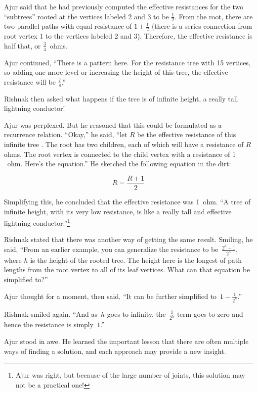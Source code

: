 Ajur said that he had previously computed the effective resistances for the two ``subtrees'' rooted at the vertices labeled 2 and 3 to be $\frac{1}{2}$. From the root, there are two parallel paths with equal resistance of $1+\frac{1}{2}$ (there is a series connection from root vertex 1 to the vertices labeled 2 and 3). Therefore, the effective resistance is half that, or $\frac{3}{4}$~ohms.

Ajur continued, ``There is a pattern here. For the resistance tree with 15 vertices, so adding one more level or increasing the height of this tree, the effective resistance will be $\frac{7}{8}$.''

Rishnak then asked what happens if the tree is of infinite height, a really tall lightning conductor!

Ajur was perplexed. But he reasoned that this could be formulated as a recurrence relation. ``Okay,'' he said, ``let $R$ be the effective resistance of this infinite tree . The root has two children, each of which will have a resistance of $R$ ohms. The root vertex is connected to the child vertex with a resistance of $1$~ohm. Here's the equation.'' He sketched the following equation in the dirt:

$$R= \frac{R+1}{2}$$


\noindent Simplifying this, he concluded that the effective resistance was 1~ohm. ``A tree of infinite height, with its very low resistance, is like a really tall and effective lightning conductor.''\footnote{Ajur was right, but because of the large number of joints, this solution may not be a practical one!}

\newpage
Rishnak stated that there was another way of getting the same result. Smiling, he said, ``From an earlier example, you can generalize the resistance to be~$\frac{2^h-1}{2^h}$, where $h$ is the height of the rooted tree. The height here is the longest of path lengths from the root vertex to all of its leaf vertices. What can that equation be simplified to?''

Ajur thought for a moment, then said, ``It can be further simplified to~$1-\frac{1}{2^h}$.''

Rishnak smiled again. ``And as~$h$ goes to infinity, the~$\frac{1}{2^h}$ term goes to zero and hence the resistance is simply~$1$.''

Ajur stood in awe. He learned the important lesson that there are often multiple ways of finding a solution, and each approach may provide a new insight.

